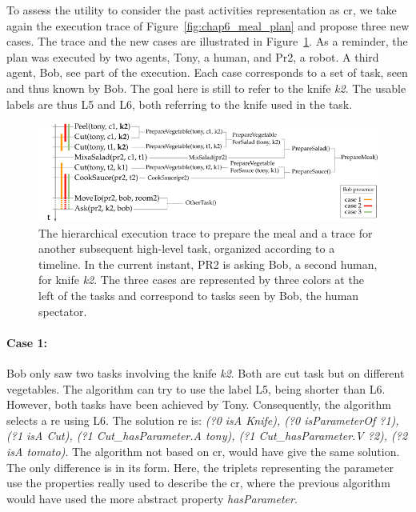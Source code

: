To assess the utility to consider the past activities representation as \acrlong{cr}, we take again the execution trace of Figure~\ref{fig:chap6_meal_plan} and propose three new cases. The trace and the new cases are illustrated in Figure~\ref{fig:chap7_meal_plan}. As a reminder, the plan was executed by two agents, Tony, a human, and Pr2, a robot. A third agent, Bob, see part of the execution. Each case corresponds to a set of task, seen and thus known by Bob. The goal here is still to refer to the knife \textit{k2}. The usable labels are thus L5 and L6, both referring to the knife used in the task.

\begin{figure}[ht!]
\centering
\includegraphics[width=\textwidth]{figures/chapter7/prepare_meal_plan.png}
\caption{\label{fig:chap7_meal_plan} The hierarchical execution trace to prepare the meal and a trace for another subsequent high-level task, organized according to a timeline. In the current instant, PR2 is asking Bob, a second human, for knife \textit{k2}. The three cases are represented by three colors at the left of the tasks and correspond to tasks seen by Bob, the human spectator.}
\end{figure}

\paragraph{Case 1:} Bob only saw two tasks involving the knife \textit{k2}. Both are cut task but on different vegetables. The algorithm can try to use the label L5, being shorter than L6. However, both tasks have been achieved by Tony. Consequently, the algorithm selects a \acrshort{re} using L6. The solution \acrshort{re} is: \textit{(?0 isA Knife), (?0 isParameterOf ?1), (?1 isA Cut), (?1 Cut\_hasParameter.A tony), (?1 Cut\_hasParameter.V ?2), (?2 isA tomato)}. The algorithm not based on \acrshort{cr}, would have give the same solution. The only difference is in its form. Here, the triplets representing the parameter use the properties really used to describe the \acrshort{cr}, where the previous algorithm would have used the more abstract property \textit{hasParameter}.

